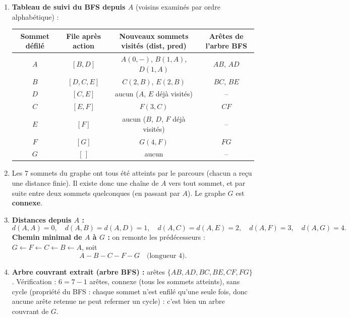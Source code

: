 \documentclass[11pt]{article}
\begin{document}
\begin{corrige}
\begin{enumerate}
\item \textbf{Tableau de suivi du BFS depuis $A$} (voisins examinés par ordre alphabétique) :
\begin{center}
\begin{tabular}{|c|c|c|c|}
\hline
\rowcolor{popblueL} Sommet défilé & File après action & Nouveaux sommets visités (dist, pred) & Arêtes de l'arbre BFS \\
\hline
$A$ & $[B, D]$ & $A(0, -)$, $B(1, A)$, $D(1, A)$ & $AB$, $AD$ \\
$B$ & $[D, C, E]$ & $C(2, B)$, $E(2, B)$ & $BC$, $BE$ \\
$D$ & $[C, E]$ & aucun ($A$, $E$ déjà visités) & -- \\
$C$ & $[E, F]$ & $F(3, C)$ & $CF$ \\
$E$ & $[F]$ & aucun ($B$, $D$, $F$ déjà visités) & -- \\
$F$ & $[G]$ & $G(4, F)$ & $FG$ \\
$G$ & $[\,]$ & aucun & -- \\
\hline
\end{tabular}
\end{center}
\item Les $7$ sommets du graphe ont tous été atteints par le parcours (chacun a reçu une distance finie). Il existe donc une chaîne de $A$ vers tout sommet, et par suite entre deux sommets quelconques (en passant par $A$). Le graphe $G$ est \textbf{connexe}.
\item \textbf{Distances depuis $A$ :}
\[ d(A,A) = 0,\quad d(A,B) = d(A,D) = 1,\quad d(A,C) = d(A,E) = 2,\quad d(A,F) = 3,\quad d(A,G) = 4. \]
\textbf{Chemin minimal de $A$ à $G$ :} on remonte les prédécesseurs : $G \leftarrow F \leftarrow C \leftarrow B \leftarrow A$, soit
\[ A - B - C - F - G \quad \text{(longueur } 4\text{)}. \]
\item \textbf{Arbre couvrant extrait (arbre BFS) :} arêtes $\{AB, AD, BC, BE, CF, FG\}$. Vérification : $6 = 7 - 1$ arêtes, connexe (tous les sommets atteints), sans cycle (propriété du BFS : chaque sommet n'est enfilé qu'une seule fois, donc aucune arête retenue ne peut refermer un cycle) : c'est bien un arbre couvrant de $G$.
\end{enumerate}
\end{corrige}
\end{document}

